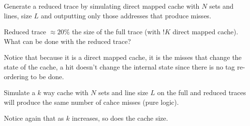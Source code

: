 \documentclass[a4paper,12pt]{article}
\begin{document}
Generate a reduced trace by simulating  direct mapped cache with $N$
sets and lines, size $L$ and outputting only those addresses that
produce misses.

Reduced trace $\approx 20\%$ the size of the full trace (with $!K$
direct mapped cache). What can be done with the reduced trace?


Notice that because it is a direct mapped cache, it is the misses that
change the state of the cache, a hit doesn't change the internal state
since there is no tag re-ordering to be done.


Simulate a $k$ way cache with $N$ sets and line size $L$ on the full and
reduced traces will produce the same number of cahce misses (pure
logic).

Notice again that as $k$ increases, so does the cache size.
\end{document}
